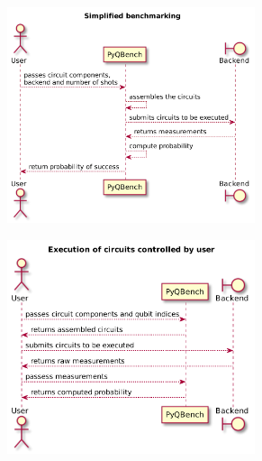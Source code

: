 \documentclass[preprint,12pt, a4paper, dvipsnames]{elsarticle}
\newcommand{\1}{{\rm 1\hspace{-0.9mm}l}}
\begin{document}
\begin{figure}[ht!]
	\centering
	\begin{subfigure}[b]{\textwidth}
		\centering
		\includegraphics[width=0.8\textwidth]{pics/scheme1}
		\label{fig:simplified}
	\end{subfigure}
	\vfill
	\begin{subfigure}[b]{\textwidth}
		\centering
	\includegraphics[width=0.8\textwidth]{pics/scheme2}
		\label{fig:execution}
	\end{subfigure}
\end{figure}

\pagebreak
\end{document}
